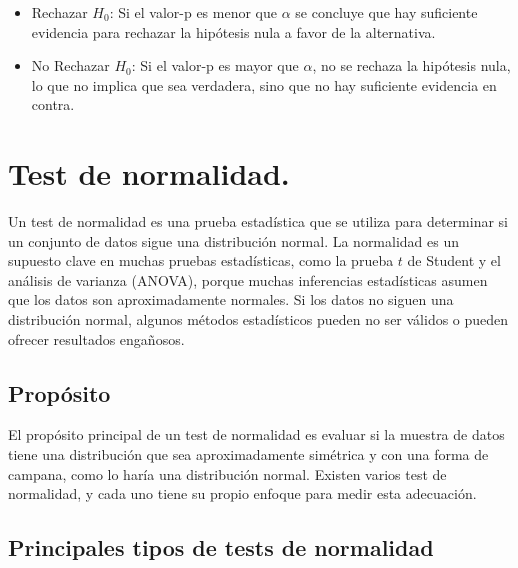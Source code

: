 \documentclass[
  us-letterpaper,
]{scrreprt}
\theoremstyle{plain}
\theoremstyle{plain}
\theoremstyle{definition}
\theoremstyle{remark}
\begin{document}
\begin{enumerate}
  \begin{itemize}
  \item
    Rechazar \(H_0\): Si el valor-p es menor que \(\alpha\) se concluye
    que hay suficiente evidencia para rechazar la hipótesis nula a favor
    de la alternativa.
  \item
    No Rechazar \(H_0\): Si el valor-p es mayor que \(\alpha\), no se
    rechaza la hipótesis nula, lo que no implica que sea verdadera, sino
    que no hay suficiente evidencia en contra.
  \end{itemize}
\end{enumerate}

\section{Test de normalidad.}\label{sec-normalidad}

Un test de normalidad es una prueba estadística que se utiliza para
determinar si un conjunto de datos sigue una distribución normal. La
normalidad es un supuesto clave en muchas pruebas estadísticas, como la
prueba \(t\) de Student y el análisis de varianza (ANOVA), porque muchas
inferencias estadísticas asumen que los datos son aproximadamente
normales. Si los datos no siguen una distribución normal, algunos
métodos estadísticos pueden no ser válidos o pueden ofrecer resultados
engañosos.

\subsection{Propósito}\label{propuxf3sito}

El propósito principal de un test de normalidad es evaluar si la muestra
de datos tiene una distribución que sea aproximadamente simétrica y con
una forma de campana, como lo haría una distribución normal. Existen
varios test de normalidad, y cada uno tiene su propio enfoque para medir
esta adecuación.

\subsection{Principales tipos de tests de
normalidad}\label{principales-tipos-de-tests-de-normalidad}
\end{document}
